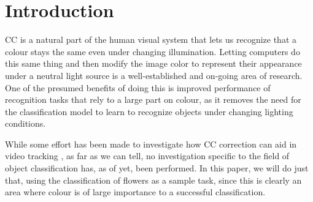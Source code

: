 \section{Introduction}

\gls{CC} is a natural part of the human visual system that lets us recognize that a colour
stays the same even under changing illumination. Letting computers do this same thing and then
modify the image color to represent their appearance under a neutral light source is a well-established
and on-going area of research. One of the presumed benefits of doing this is improved performance
of recognition tasks that rely to a large part on colour, as it removes the need for the classification
model to learn to recognize objects under changing lighting conditions.

While some effort has been made to investigate how \gls{CC} correction can aid in video tracking
\cite{Agarwal2006}, as far as we can tell, no investigation specific to the field of object
classification has, as of yet, been performed. In this paper, we will do just that, using the
classification of flowers as a sample task, since this is clearly an area where colour is of large
importance to a successful classification.

